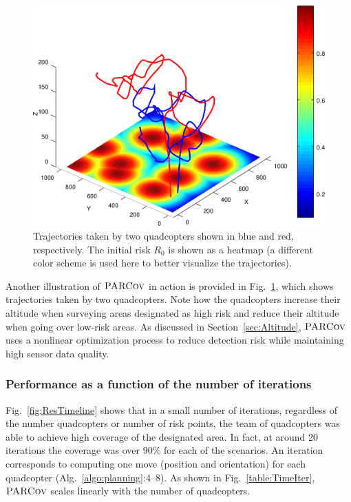 \documentclass[letterpaper, 10pt, conference]{ieeeconf}
\newcommand{\Function}[1]{\ensuremath{{ \textsc{#1}}}}
\newcommand{\Name}{\Function{\small{PARCov}}}
\begin{document}
\begin{figure}[t]
\centering
\includegraphics[width=0.8\columnwidth]{usef/trajectories}

\caption{Trajectories taken by two quadcopters shown in blue and red,
respectively. The initial risk $R_0$ is shown as a heatmap (a different color scheme is used here to better visualize the trajectories). }

\label{fig:Trajs}
\end{figure}

Another illustration of $\Name$ in action is provided in
Fig.~\ref{fig:Trajs}, which shows  trajectories
taken by two quadcopters. Note how the quadcopters increase their
altitude when surveying areas designated as high risk and reduce their
altitude when going over low-risk areas. As discussed in
Section~\ref{sec:Altitude}, $\Name$ uses a nonlinear optimization
process to reduce detection risk while maintaining
high sensor data quality.


\subsubsection{Performance as a function of the number of iterations}
Fig.~\ref{fig:ResTimeline}
shows that in a small number of iterations, regardless
of the number quadcopters or number of risk points, the team of quadcopters
was able to achieve high coverage of the designated
area. In fact, at around 20 iterations the coverage was over 90\%
for each of the scenarios. An iteration corresponds to computing one
move (position and orientation) for each quadcopter
(Alg.~\ref{algo:planning}:4--8). As shown in
Fig.~\ref{table:TimeIter}, $\Name$ scales linearly with the number of
quadcopters.

\end{document}
